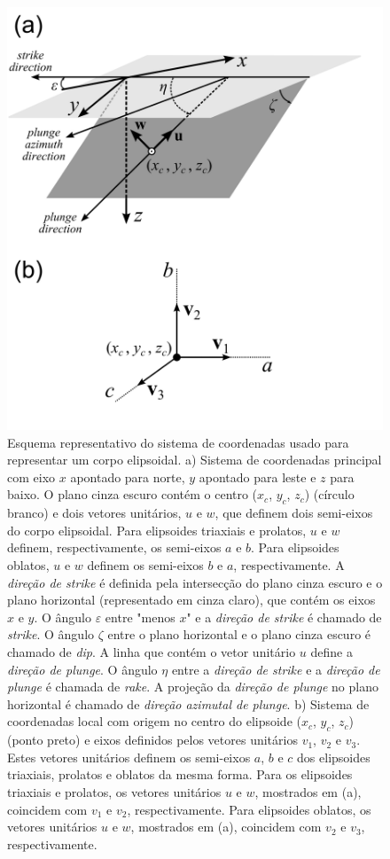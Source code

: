 \begin{figure}[hbt!]
	\centering \includegraphics[width=12 cm,height=14.5 cm]{figures/structural_orientation_angles}
	\caption[Esquema representativo do sistema de coordenadas usado para representar um corpo elipsoidal.]{Esquema representativo do sistema de coordenadas usado para representar um corpo elipsoidal. a) Sistema de coordenadas principal com eixo $x$ apontado para norte, $y$ apontado para leste e $z$ para baixo. O plano cinza escuro contém o centro ($x_c$, $y_c$, $z_c$) (círculo branco) e dois vetores unitários, $u$ e $w$, que definem dois semi-eixos do corpo elipsoidal. Para elipsoides triaxiais e prolatos, $u$ e $w$ definem, respectivamente, os semi-eixos $a$ e $b$. Para elipsoides oblatos, $u$ e $w$ definem os semi-eixos $b$ e $a$, respectivamente. A \textit{direção de strike} é definida pela intersecção do plano cinza escuro e o plano horizontal (representado em cinza claro), que contém os eixos $x$ e $y$. O ângulo $\varepsilon$ entre "menos $x$" e a \textit{direção de strike} é chamado de \textit{strike}. O ângulo $\zeta$ entre o plano horizontal e o plano cinza escuro é chamado de \textit{dip}. A linha que contém o vetor unitário $u$ define a \textit{direção de plunge}. O ângulo $\eta$ entre a \textit{direção de strike} e a \textit{direção de plunge} é chamada de \textit{rake}. A projeção da \textit{direção de plunge} no plano horizontal é chamado de \textit{direção azimutal de plunge}. b) Sistema de coordenadas local com origem no centro do elipsoide ($x_c$, $y_c$, $z_c$) (ponto preto) e eixos definidos pelos vetores unitários $v_1$, $v_2$ e $v_3$. Estes vetores unitários definem os semi-eixos $a$, $b$ e $c$ dos elipsoides triaxiais, prolatos e oblatos da mesma forma. Para os  elipsoides triaxiais e prolatos, os vetores unitários $u$ e $w$, mostrados em  (a), coincidem com $v_1$ e $v_2$, respectivamente. Para elipsoides oblatos, os vetores unitários $u$ e $w$, mostrados em (a), coincidem com $v_2$ e $v_3$, respectivamente.}

\end{figure}

